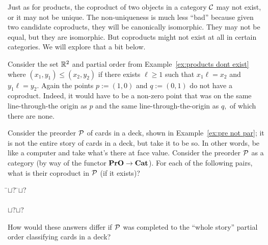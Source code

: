 \documentclass[CT4S-EN-RU]{subfiles}
\begin{document}
\begin{exampleRUS}
\end{exampleRUS}

\begin{blockENG}
Just as for products, the coproduct of two objects in a category $\mathcal{C}$ may not exist, or it may not be unique. The non-uniqueness is much less “bad” because given two candidate coproducts, they will be canonically isomorphic. They may not be equal, but they are isomorphic. But coproducts might not exist at all in certain categories. We will explore that a bit below.
\end{blockENG}

\begin{blockRUS}
\end{blockRUS}

\begin{exampleENG}
Consider the set ${\mathbb R}^2$ and partial order from Example~\ref{ex:products dont exist} where $(x_1,y_1)\leq (x_2,y_2)$ if there exists $\ell\geq 1$ such that $x_1\ell=x_2$ and $y_1\ell=y_2.$ Again the points $p:=(1,0)$ and $q:=(0,1)$ do not have a coproduct. Indeed, it would have to be a non-zero point that was on the same line-through-the origin as $p$ and the same line-through-the-origin as $q,$ of which there are none.
\end{exampleENG}

\begin{exampleRUS}
\end{exampleRUS}

\begin{exerciseENG}
Consider the preorder $\mathcal{P}$ of cards in a deck, shown in Example~\ref{ex:pre not par}; it is not the entire story of cards in a deck, but take it to be so. In other words, be like a computer and take what's there at face value. Consider the preorder $\mathcal{P}$ as a category (by way of the functor ${\mathbf{PrO}}\rightarrow{\mathbf{Cat}}$). For each of the following pairs, what is their coproduct in $\mathcal{P}$ (if it exists)?
\sexc 
\begin{tabbing}
\hspace{.5in}\= $\sqcup$\;?\hspace{.5in} \=$\sqcup$\;?\\\\
\> $\sqcup$\;?\>$\sqcup$\;?
\end{tabbing}
\item How would these answers differ if $\mathcal{P}$ was completed to the “whole story” partial order classifying cards in a deck?
\endsexc
\end{exerciseENG}
\end{document}
